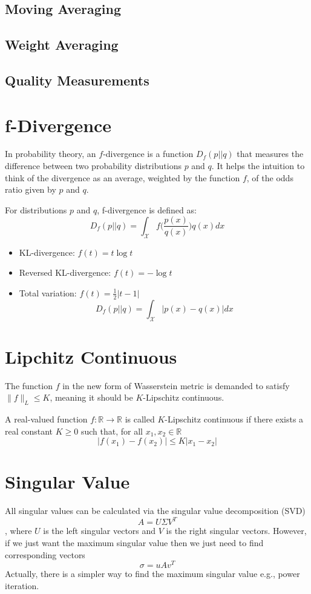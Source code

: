 \begin{appendices}
\subsection{Moving Averaging}

\subsection{Weight Averaging}

\subsection{Quality Measurements}

\section{f-Divergence}
In probability theory, an $f$-divergence is a function $D_{f}(p||q)$ that measures the difference between two probability distributions $p$ and $q$. It helps the intuition to think of the divergence as an average, weighted by the function $f$, of the odds ratio given by $p$ and $q$.

For distributions $p$ and $q$, f-divergence is defined as:
$$D_{f}(p||q) = \int_{\mathcal{X}}f\Bigg(\frac{p(x)}{q(x)}\Bigg)q(x)dx$$

\begin{itemize}
	\item KL-divergence: $f(t) = t\log t$
	\item Reversed KL-divergence: $f(t) = -\log t$
	\item Total variation: $f(t) = \frac{1}{2}|t-1|$
	$$D_{f}(p||q) = \int_{\mathcal{X}}|p(x)-q(x)|dx$$
\end{itemize}

\section{Lipchitz Continuous}
The function $f$ in the new form of Wasserstein metric is demanded to satisfy $\| f \|_L \leq K$, meaning it should be $K$-Lipschitz continuous. \citep{Lil2017}

A real-valued function $f: \mathbb{R} \rightarrow \mathbb{R}$ is called $K$-Lipschitz continuous if there exists a real constant $K\geq 0$ such that, for all $x_1, x_2 \in \mathbb{R}$
$$\lvert f(x_1) - f(x_2) \rvert \leq K \lvert x_1 - x_2 \rvert$$

\section{Singular Value}
All singular values can be calculated via the singular value decomposition (SVD)
$$A = U\Sigma V^T$$
, where $U$ is the left singular vectors and $V$ is the right singular vectors. However, if we just want the maximum singular value then we just need to find corresponding vectors
$$\sigma = uAv^T$$
Actually, there is a simpler way to find the maximum singular value e.g., power iteration. 



\end{appendices}
